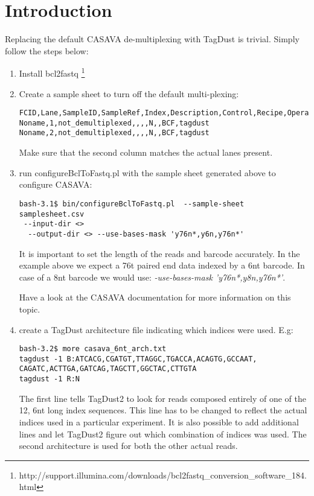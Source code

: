 \documentclass[11pt,a4paper,oneside]{book}
\begin{document}
\mainmatter

\section*{Introduction}

Replacing the default CASAVA de-multiplexing with TagDust is trivial. Simply follow the steps below: 

\begin{enumerate}
\item Install bcl2fastq \footnote{http://support.illumina.com/downloads/bcl2fastq\_conversion\_software\_184.html}
\item Create a sample sheet to turn off the default multi-plexing:
\begin{verbatim}
FCID,Lane,SampleID,SampleRef,Index,Description,Control,Recipe,Operator,SampleProject
Noname,1,not_demultiplexed,,,,N,,BCF,tagdust
Noname,2,not_demultiplexed,,,,N,,BCF,tagdust
\end{verbatim}
Make sure that the second column matches the actual lanes present.

\item run configureBclToFastq.pl with the sample sheet generated above to configure CASAVA:

\begin{verbatim}
bash-3.1$ bin/configureBclToFastq.pl  --sample-sheet  samplesheet.csv 
 --input-dir <>
  --output-dir <> --use-bases-mask 'y76n*,y6n,y76n*'
\end{verbatim}
It is important to set the length of the reads and barcode accurately. In the example above we expect a 76t paired end data indexed by a 6nt barcode. In case of a 8nt barcode we would use: {\it -use-bases-mask 'y76n*,y8n,y76n*'}.

Have a look at the CASAVA documentation for more information on this topic. 

\item create a TagDust architecture file indicating which indices were used. E.g:
\begin{verbatim}
bash-3.2$ more casava_6nt_arch.txt 
tagdust -1 B:ATCACG,CGATGT,TTAGGC,TGACCA,ACAGTG,GCCAAT,
CAGATC,ACTTGA,GATCAG,TAGCTT,GGCTAC,CTTGTA
tagdust -1 R:N  
\end{verbatim}

The first line tells TagDust2 to look for reads composed entirely of one of the 12, 6nt long index sequences. This line has to be changed to reflect the actual indices used in a particular experiment. It is also possible to add additional lines and let TagDust2 figure out which combination of indices was used. The second architecture is used for both the other actual reads.


\end{enumerate}
\end{document}

